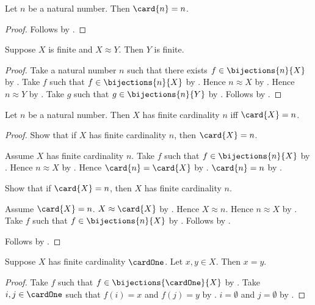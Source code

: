 \begin{corollary}\label{card_of_natural_number}
    Let $n$ be a natural number.
    Then $\card{n}=n$.
\end{corollary}
\begin{proof}
    Follows by .
\end{proof}

\begin{theorem}\label{finite_equinumerous}
    Suppose $X$ is finite and $X\approx Y$.
    Then $Y$ is finite.
\end{theorem}
\begin{proof}
    Take a natural number $n$ such that there exists
        $f\in\bijections{n}{X}$ by .
    Take $f$ such that $f\in\bijections{n}{X}$ by \auto.
    Hence $n\approx X$ by .
    Hence $n\approx Y$ by .
    Take $g$ such that $g\in\bijections{n}{Y}$ by .
    Follows by .
\end{proof}

\begin{theorem}\label{finite_cardinality_iff_card}
    Let $n$ be a natural number.
    Then $X$ has finite cardinality $n$ iff $\card{X}=n$.
\end{theorem}
\begin{proof}
    Show that if $X$ has finite cardinality $n$, then $\card{X}=n$.
    \begin{subproof}
        Assume $X$ has finite cardinality $n$.
        Take $f$ such that $f\in\bijections{n}{X}$
            by .
        Hence $n\approx X$ by .
        Hence $\card{n}=\card{X}$
            by .
        $\card{n}=n$ by .
    \end{subproof}
    Show that if $\card{X}=n$, then
        $X$ has finite cardinality $n$.
    \begin{subproof}
        Assume $\card{X}=n$.
        $X\approx\card{X}$ by .
        Hence $X\approx n$.
        Hence $n\approx X$ by .
        Take $f$ such that $f\in\bijections{n}{X}$ by .
        Follows by .
    \end{subproof}
    Follows by \auto.
\end{proof}

\begin{proposition}\label{finite_cardinality_one_elements_equal}
    Suppose $X$ has finite cardinality $\cardOne$.
    Let $x,y\in X$.
    Then $x=y$.
\end{proposition}
\begin{proof}
    Take $f$ such that $f\in\bijections{\cardOne}{X}$ by
        .
    Take $i,j\in\cardOne$ such that $f(i)=x$ and $f(j)=y$ by
        .
    $i=\emptyset$ and $j=\emptyset$ by
        .
\end{proof}


